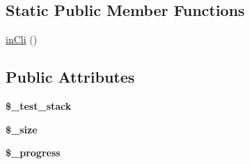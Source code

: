 \subsection*{Static Public Member Functions}
\begin{DoxyCompactItemize}
\item 
\hyperlink{class_simple_reporter_ab6887c05e232ca0d00104119ede58d85}{inCli} ()
\end{DoxyCompactItemize}
\subsection*{Public Attributes}
\begin{DoxyCompactItemize}
\item 
\hypertarget{class_simple_reporter_aebd08a1e933c25f0e79e526ca39d6e42}{
{\bfseries \$\_\-test\_\-stack}}
\label{class_simple_reporter_aebd08a1e933c25f0e79e526ca39d6e42}

\item 
\hypertarget{class_simple_reporter_a20085ecf75083c8a06f67410298419dc}{
{\bfseries \$\_\-size}}
\label{class_simple_reporter_a20085ecf75083c8a06f67410298419dc}

\item 
\hypertarget{class_simple_reporter_a8f61c87cea0800a5196663a5f1c7751b}{
{\bfseries \$\_\-progress}}
\label{class_simple_reporter_a8f61c87cea0800a5196663a5f1c7751b}

\end{DoxyCompactItemize}


